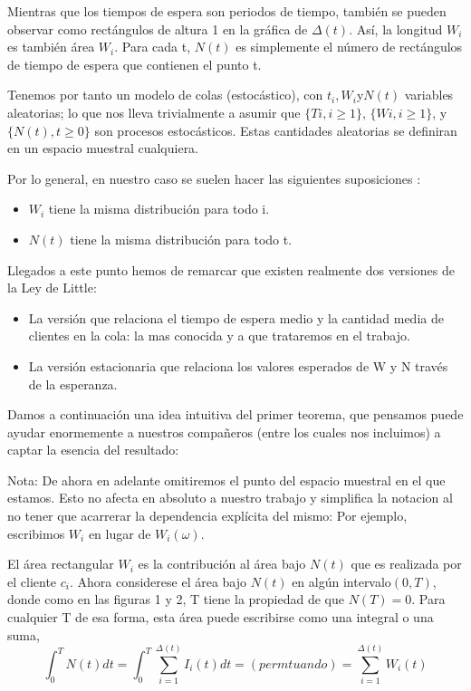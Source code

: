\documentclass[a4paper,10pt]{scrartcl}
\theoremstyle{definition}
\numberwithin{equation}{section}
\begin{document}
Mientras que los tiempos de espera son periodos de tiempo, también se pueden observar como rectángulos de altura 1 en la gráfica de ${\Delta(t)}$. Así, la longitud $W_i$ es también área $W_i$. Para cada t, $N (t)$ es simplemente el número de rectángulos de tiempo de espera que contienen el punto t.

Tenemos por tanto un modelo de colas (estocástico), con $ t_i, W_i $y$ N(t)$ variables aleatorias; lo que nos lleva trivialmente a asumir que  $\{T i, i \geq 1\}$, $\{W i, i \geq 1\}$, y $\{N (t), t \geq 0\}$ son procesos estocásticos. Estas cantidades aleatorias se definiran en un espacio muestral cualquiera. 

Por lo general, en nuestro caso se suelen hacer las siguientes suposiciones :
\begin{itemize}
	\item $W_i$ tiene la misma distribución para todo i.
	\item $N (t)$ tiene la misma distribución para todo t. 
\end{itemize} 

Llegados a este punto hemos de remarcar que existen realmente dos versiones de la Ley de Little: \begin{itemize}
	\item La versión que relaciona el tiempo de espera medio y la cantidad media de clientes en la cola: la mas conocida y a que trataremos en el trabajo.
	\item La versión estacionaria que relaciona los valores esperados de W y N través de la esperanza. 
\end{itemize}

Damos a continuación una idea intuitiva del primer teorema, que pensamos puede ayudar enormemente a nuestros compañeros (entre los cuales nos incluimos) a captar la esencia del resultado:

Nota: De ahora en adelante omitiremos el punto del espacio muestral en el que estamos. Esto no afecta en absoluto a nuestro trabajo y simplifica la notacion al no tener que acarrerar la dependencia explícita del mismo: Por ejemplo, escribimos $W_i$ en lugar de $W_i (\omega)$.

El área rectangular $W_i$ es la contribución al área bajo ${N (t)}$ que es realizada por el cliente $c_i$. Ahora considerese el área bajo ${N (t)}$ en algún intervalo$(0, T)$, donde como en las figuras 1 y 2, T tiene la propiedad de que $N (T) = 0$. Para cualquier T de esa forma, esta área puede escribirse como una integral o una suma,\[\int_{0}^{T} N(t)dt=\int_{0}^{T} \sum_{i=1}^{\Delta (t)} I_i(t) dt=(permtuando)=\sum_{i=1}^{\Delta (t)} W_i(t)  \]
\end{document}
